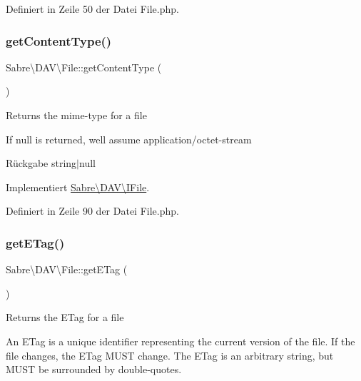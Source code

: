 Definiert in Zeile 50 der Datei File.\+php.

\mbox{\label{class_sabre_1_1_d_a_v_1_1_file_af691c1f6e2de8640042b2a75181c4af5}} 
\subsubsection{\texorpdfstring{get\+Content\+Type()}{getContentType()}}
{\footnotesize\ttfamily Sabre\textbackslash{}\+D\+A\+V\textbackslash{}\+File\+::get\+Content\+Type (\begin{DoxyParamCaption}{ }\end{DoxyParamCaption})}

Returns the mime-\/type for a file

If null is returned, we\textquotesingle{}ll assume application/octet-\/stream

\begin{DoxyReturn}{Rückgabe}
string$\vert$null 
\end{DoxyReturn}


Implementiert \mbox{\hyperlink{interface_sabre_1_1_d_a_v_1_1_i_file_aa76147e3e0ad228026dcb03035b499bc}{Sabre\textbackslash{}\+D\+A\+V\textbackslash{}\+I\+File}}.



Definiert in Zeile 90 der Datei File.\+php.

\mbox{\label{class_sabre_1_1_d_a_v_1_1_file_a2f7e2ec46cb8def9cda8dea55faf7d9e}} 
\subsubsection{\texorpdfstring{get\+E\+Tag()}{getETag()}}
{\footnotesize\ttfamily Sabre\textbackslash{}\+D\+A\+V\textbackslash{}\+File\+::get\+E\+Tag (\begin{DoxyParamCaption}{ }\end{DoxyParamCaption})}

Returns the E\+Tag for a file

An E\+Tag is a unique identifier representing the current version of the file. If the file changes, the E\+Tag M\+U\+ST change. The E\+Tag is an arbitrary string, but M\+U\+ST be surrounded by double-\/quotes.

